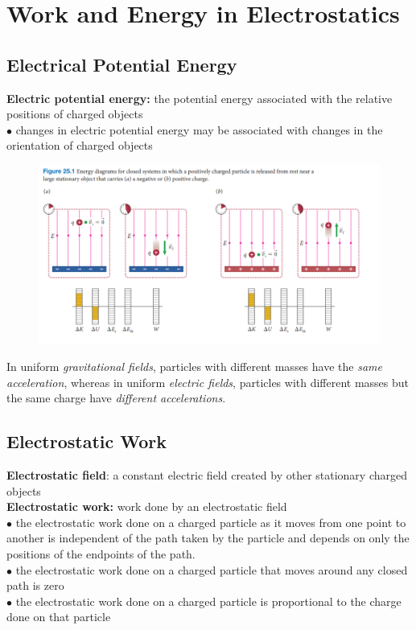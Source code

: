 \section{Work and Energy in Electrostatics}

    \subsection{Electrical Potential Energy}    %

        \textbf{Electric potential energy:} the potential energy associated with the relative positions of charged objects \\
        $\bullet$ changes in electric potential energy may be associated with changes in the orientation of charged objects

        \begin{figure}[hbt!]
            \centering
            \includegraphics[scale = 0.75]{Resources/25.1_Energy_Diagrams}
        \end{figure}

        In uniform \textit{gravitational fields}, particles with different masses have the \textit{same acceleration}, whereas in uniform \textit{electric fields}, particles with different masses but the same charge have
        \textit{different accelerations}.

    \subsection{Electrostatic Work}     %

        \textbf{Electrostatic field}: a constant electric field created by other stationary charged objects \\
        \textbf{Electrostatic work:} work done by an electrostatic field \\
        $\bullet$ the electrostatic work done on a charged particle as it moves from one point to another is independent of the path taken by the particle and depends on only the positions of the endpoints of the path. \\
        $\bullet$ the electrostatic work done on a charged particle that moves around any closed path is zero \\
        $\bullet$ the electrostatic work done on a charged particle is proportional to the charge done on that particle

